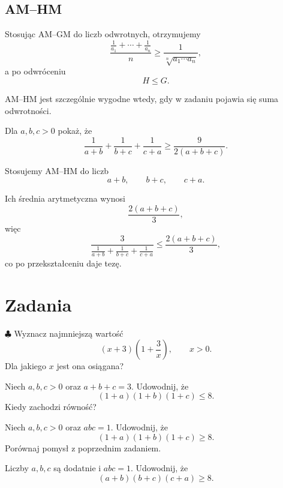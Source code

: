 \documentclass{lecture-kuznia}
\begin{document}
\subsection{AM--HM}

Stosując AM--GM do liczb odwrotnych, otrzymujemy
\[
	\frac{\frac1{a_1}+\cdots+\frac1{a_n}}{n}
	\ge
	\frac1{\sqrt[n]{a_1\cdots a_n}},
\]
a po odwróceniu
\[
	H\le G.
\]

AM--HM jest szczególnie wygodne wtedy, gdy w zadaniu pojawia się suma
odwrotności.

\begin{example}\label{E2}
	Dla $a,b,c>0$ pokaż, że
	\[
		\frac1{a+b}+\frac1{b+c}+\frac1{c+a}
		\ge
		\frac9{2(a+b+c)}.
	\]
\end{example}

\begin{solution*}[\ref{E2}]
	Stosujemy AM--HM do liczb
	\[
		a+b,\qquad b+c,\qquad c+a.
	\]

	Ich średnia arytmetyczna wynosi
	\[
		\frac{2(a+b+c)}3,
	\]
	więc
	\[
		\frac{3}{
			\frac1{a+b}+\frac1{b+c}+\frac1{c+a}
		}
		\le
		\frac{2(a+b+c)}3,
	\]
	co po przekształceniu daje tezę.
\end{solution*}

\newpage

\section{Zadania}

\begin{problem}{$\clubsuit$}\label{Z1}
	Wyznacz najmniejszą wartość
	\[
		(x+3)\left(1+\frac3x\right),
		\qquad x>0.
	\]
	Dla jakiego $x$ jest ona osiągana?
\end{problem}

\begin{problem}\label{Z2}
	Niech $a,b,c>0$ oraz $a+b+c=3$. Udowodnij, że
	\[
		(1+a)(1+b)(1+c)\le8.
	\]
	Kiedy zachodzi równość?
\end{problem}

\begin{problem}\label{Z3}
	Niech $a,b,c>0$ oraz $abc=1$. Udowodnij, że
	\[
		(1+a)(1+b)(1+c)\ge8.
	\]
	Porównaj pomysł z poprzednim zadaniem.
\end{problem}

\begin{problem}\label{Z4}
	Liczby $a,b,c$ są dodatnie i $abc=1$. Udowodnij, że
	\[
		(a+b)(b+c)(c+a)\ge8.
	\]
\end{problem}
\end{document}
